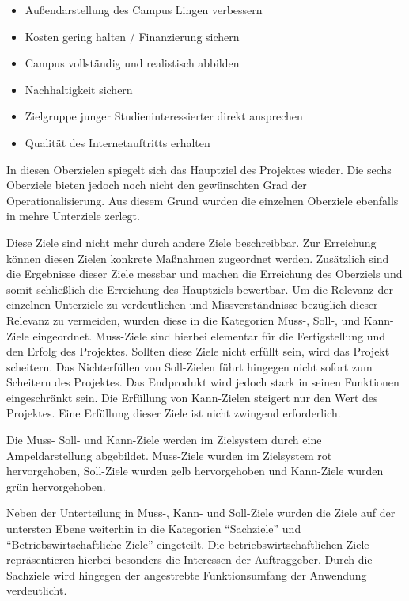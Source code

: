 \begin{itemize}
  \item Außendarstellung des Campus Lingen verbessern
  \item Kosten gering halten / Finanzierung sichern
  \item Campus vollständig und realistisch abbilden
  \item Nachhaltigkeit sichern
  \item Zielgruppe junger Studieninteressierter direkt ansprechen
  \item Qualität des Internetauftritts erhalten
\end{itemize}

In diesen Oberzielen spiegelt sich das Hauptziel des Projektes wieder. Die
sechs Oberziele bieten jedoch noch nicht den gewünschten Grad der
Operationalisierung. Aus diesem Grund wurden die einzelnen Oberziele ebenfalls
in mehre Unterziele zerlegt.

Diese Ziele sind nicht mehr durch andere Ziele beschreibbar. Zur Erreichung
können diesen Zielen konkrete Maßnahmen zugeordnet werden. Zusätzlich sind die
Ergebnisse dieser Ziele messbar und machen die Erreichung des Oberziels und
somit schließlich die Erreichung des Hauptziels bewertbar. Um die Relevanz der
einzelnen Unterziele zu verdeutlichen und Missverständnisse bezüglich dieser
Relevanz zu vermeiden, wurden diese in die Kategorien Muss-, Soll-, und
Kann-Ziele eingeordnet. Muss-Ziele sind hierbei elementar für die
Fertigstellung und den Erfolg des Projektes. Sollten diese Ziele nicht erfüllt
sein, wird das Projekt scheitern. Das Nichterfüllen von Soll-Zielen führt
hingegen nicht sofort zum Scheitern des Projektes. Das Endprodukt wird jedoch
stark in seinen Funktionen eingeschränkt sein. Die Erfüllung von Kann-Zielen
steigert nur den Wert des Projektes. Eine Erfüllung dieser Ziele ist nicht
zwingend erforderlich.

Die Muss- Soll- und Kann-Ziele werden im Zielsystem durch eine Ampeldarstellung
abgebildet.  Muss-Ziele wurden im Zielsystem rot hervorgehoben, Soll-Ziele
wurden gelb hervorgehoben und Kann-Ziele wurden grün hervorgehoben.

Neben der Unterteilung in Muss-, Kann- und Soll-Ziele wurden die Ziele auf der
untersten Ebene weiterhin in die Kategorien "`Sachziele"' und
"`Betriebswirtschaftliche Ziele"' eingeteilt. Die betriebswirtschaftlichen
Ziele repräsentieren hierbei besonders die Interessen der Auftraggeber. Durch
die Sachziele wird hingegen der angestrebte Funktionsumfang der Anwendung
verdeutlicht.

